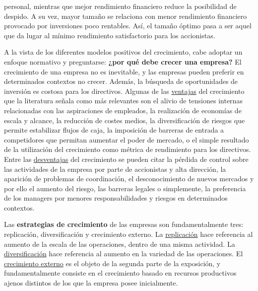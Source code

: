 \documentclass{nuevotema}
\begin{document}
personal, mientras que mejor rendimiento financiero reduce la posibilidad de despido. A su vez, mayor tamaño se relaciona con menor rendimiento financiero provocado por inversiones poco rentables. Así, el tamaño óptimo pasa a ser aquel que da lugar al mínimo rendimiento satisfactorio para los accionistas.

A la vista de los diferentes modelos positivos del crecimiento, cabe adoptar un enfoque normativo y preguntarse: \textbf{¿por qué debe crecer una empresa?} El crecimiento de una empresa no es inevitable, y las empresas pueden preferir en determinados contextos no crecer. Además, la búsqueda de oportunidades de inversión es costosa para los directivos. Algunas de las \underline{ventajas} del crecimiento que la literatura señala como más relevantes son el alivio de tensiones internas relacionadas con las aspiraciones de empleados, la realización de economías de escala y alcance, la reducción de costes medios, la diversificación de riesgos que permite estabilizar flujos de caja, la imposición de barreras de entrada a competidores que permitan aumentar el poder de mercado, o el simple resultado de la utilización del crecimiento como métrica de rendimiento para los directivos. Entre las \underline{desventajas} del crecimiento se pueden citar la pérdida de control sobre las actividades de la empresa por parte de accionistas y alta dirección, la aparición de problemas de coordinación, el desconocimiento de nuevos mercados y por ello el aumento del riesgo, las barreras legales o simplemente, la preferencia de los managers por menores responsabilidades y riesgos en determinados contextos.

Las \textbf{estrategias de crecimiento} de las empresas son fundamentalmente tres: replicación, diversificación y crecimiento externo. La \underline{replicación} hace referencia al aumento de la escala de las operaciones, dentro de una misma actividad. La \underline{diversificación} hace referencia al aumento en la variedad de las operaciones. El \underline{crecimiento externo} es el objeto de la segunda parte de la exposición, y fundamentalmente consiste en el crecimiento basado en recursos productivos ajenos distintos de los que la empresa posee inicialmente.
\end{document}

